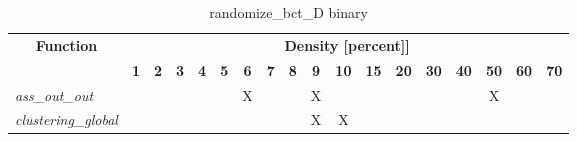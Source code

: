 \begin{table}[h] \centering \begin{tabular}{|l|c|c|c|c|c|c|c|c|c|c|c|c|c|c|c|c|c|} \hline\multicolumn{1}{|c|}{\textbf{\large{Function}}} & \multicolumn{17}{c|}{\large{\textbf{Density [percent]]}}}\\\cline{2-18}  & \textbf{1} &  \textbf{2} &  \textbf{3} &  \textbf{4} &  \textbf{5} &  \textbf{6} &  \textbf{7} &  \textbf{8} &  \textbf{9} &  \textbf{10} &  \textbf{15} &  \textbf{20} &  \textbf{30} &  \textbf{40} &  \textbf{50} &  \textbf{60} &  \textbf{70} \\ \hline   \textit{ass\_out\_out} &   &   &   &   &   & X &   &   & X &   &   &   &   &   & X &   &   \\ \hline  \textit{clustering\_global} &   &   &   &   &   &   &   &   & X & X &   &   &   &   &   &   &   \\ \hline \end{tabular}\caption{randomize\_bct\_D binary}\label{tab:my_label} \end{table}